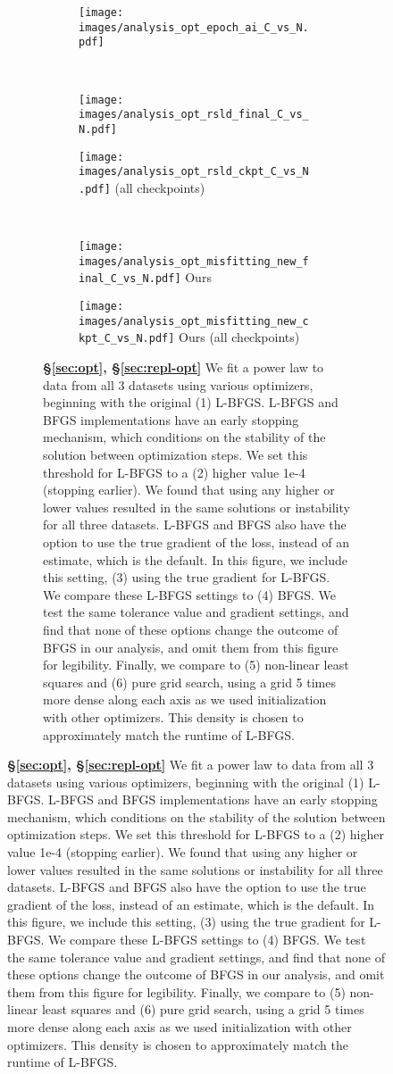 \begin{figure}[]
\ContinuedFloat
\centering 
\begin{subfigure}{\textwidth}
    \centering
\begin{subfigure}{0.49\textwidth}
    \centering
    \texttt{[image: images/analysis\_opt\_epoch\_ai\_C\_vs\_N.pdf]}
\footnotesize{\citet{hoffmann2022training,besiroglu2024chinchilla}}
\end{subfigure}
\\ \vspace{1em}
\begin{subfigure}{0.49\textwidth}
    \centering
    \texttt{[image: images/analysis\_opt\_rsld\_final\_C\_vs\_N.pdf]}
    \footnotesize{\citet{porian2024resolving}}
\end{subfigure}
\hfill
\begin{subfigure}{0.49\textwidth}
    \centering
    \texttt{[image: images/analysis\_opt\_rsld\_ckpt\_C\_vs\_N.pdf]}
    \footnotesize{\citet{porian2024resolving} (all checkpoints)}
\end{subfigure}
\\ \vspace{1em}
    \centering
\begin{subfigure}{0.49\textwidth}
    \centering
    \texttt{[image: images/analysis\_opt\_misfitting\_new\_final\_C\_vs\_N.pdf]}
    \footnotesize{Ours}
\end{subfigure}
\hfill
\begin{subfigure}{0.49\textwidth}
    \centering
    \texttt{[image: images/analysis\_opt\_misfitting\_new\_ckpt\_C\_vs\_N.pdf]}
    \footnotesize{Ours (all checkpoints)}
\end{subfigure}
\caption{\textbf{\S\ref{sec:opt}, \S\ref{sec:repl-opt}} We fit a power law to data from all 3 datasets using various optimizers, beginning with the original (1) L-BFGS. L-BFGS and BFGS implementations have an early stopping mechanism, which conditions on the stability of the solution between optimization steps. We set this threshold for L-BFGS to a (2) higher value 1e-4 (stopping earlier).
We found that using any higher or lower values resulted in the same solutions or instability for all three datasets. L-BFGS and BFGS also have the option to use the true gradient of the loss, instead of an estimate, which is the default. In this figure, we include this setting, (3) using the true gradient for L-BFGS. We compare these L-BFGS settings to (4) BFGS. We test the same tolerance value and gradient settings, and find that none of these options change the outcome of BFGS in our analysis, and omit them from this figure for legibility. Finally, we compare to (5) non-linear least squares and (6) pure grid search, using a grid 5 times more dense along each axis as we used initialization with other optimizers. This density is chosen to approximately match the runtime of L-BFGS.
}
\end{subfigure}
\end{figure}
